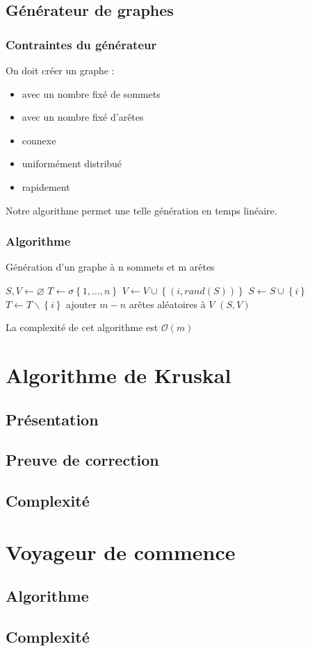\documentclass[handout]{beamer}
\begin{document}
		\subsection{Générateur de graphes}
			\begin{frame}
				\frametitle{Contraintes du générateur}
				On doit créer un graphe :
				\begin{itemize}
					\item avec un nombre fixé de sommets
					\item avec un nombre fixé d'arêtes
					\item connexe
					\item uniformément distribué
					\item rapidement
				\end{itemize}
				Notre algorithme permet une telle génération en temps linéaire.
			\end{frame}
			\begin{frame}
				\frametitle{Algorithme}
				
				\begin{algorithm}[H]
					\caption{Génération d'un graphe à n sommets
					et m arêtes}
					\begin{algorithmic}[H]
						\STATE $S,V \leftarrow \varnothing$
						\STATE $T \leftarrow \sigma\left\{1,...,n\right\}$
						\STATE $V \leftarrow V\cup\left\{(i,rand(S))\right\}$
						\STATE $S \leftarrow S\cup\left\{i\right\}$
						\STATE $T \leftarrow T\backslash\left\{i\right\}$
						\ENDFOR
						\STATE ajouter $m-n$ arêtes aléatoires à $V$
						\RETURN $(S,V)$
					\end{algorithmic}
				\end{algorithm}
				La complexité de cet algorithme est $\mathcal{O}(m)$
			\end{frame}

	\section{Algorithme de Kruskal}

	\subsection{Présentation}

	\subsection{Preuve de correction}

	\subsection{Complexité}

	\section{Voyageur de commence}

	\subsection{Algorithme}

	\subsection{Complexité}
\end{document}
